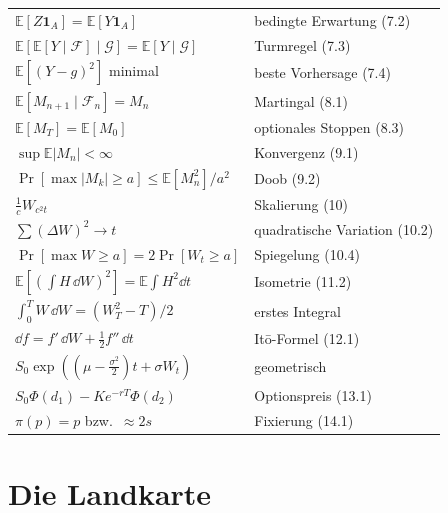 \begin{merksatz}
\begin{center}
{\small
\renewcommand{\arraystretch}{1.6}
\begin{tabular}{@{}P{4.4cm}P{4.2cm}@{}}
\toprule
$\mathbb{E}[Z\mathbf 1_A] = \mathbb{E}[Y\mathbf 1_A]$ & bedingte Erwartung (7.2)\\
$\mathbb{E}[\mathbb{E}[Y\mid\mathcal F]\mid\mathcal G] = \mathbb{E}[Y\mid\mathcal G]$ & Turmregel (7.3)\\
$\mathbb{E}[(Y-g)^{2}]$ minimal & beste Vorhersage (7.4)\\
$\mathbb{E}[M_{n+1}\mid\mathcal F_n] = M_n$ & Martingal (8.1)\\
$\mathbb{E}[M_T] = \mathbb{E}[M_0]$ & optionales Stoppen (8.3)\\
$\sup\mathbb{E}|M_n| < \infty$ & Konvergenz (9.1)\\
$\Pr[\max|M_k| \ge a] \le \mathbb{E}[M_n^{2}]/a^{2}$ & Doob (9.2)\\
$\tfrac1c W_{c^{2}t}$ & Skalierung (10)\\
$\sum(\Delta W)^{2} \to t$ & quadratische Variation (10.2)\\
$\Pr[\max W \ge a] = 2\Pr[W_t \ge a]$ & Spiegelung (10.4)\\
$\mathbb{E}[(\int H\,\dd W)^{2}] = \mathbb{E}\int H^{2}\dd t$ & Isometrie (11.2)\\
$\int_0^T W\,\dd W = (W_T^{2}-T)/2$ & erstes Integral\\
$\dd f = f'\,\dd W + \tfrac12 f''\,\dd t$ & Itō-Formel (12.1)\\
$S_0\exp((\mu-\tfrac{\sigma^{2}}2)t+\sigma W_t)$ & geometrisch\\
$S_0\Phi(d_1)-Ke^{-rT}\Phi(d_2)$ & Optionspreis (13.1)\\
$\pi(p) = p$ bzw.\ $\approx 2s$ & Fixierung (14.1)\\
\bottomrule
\end{tabular}}
\end{center}
\end{merksatz}

\section{Die Landkarte}

